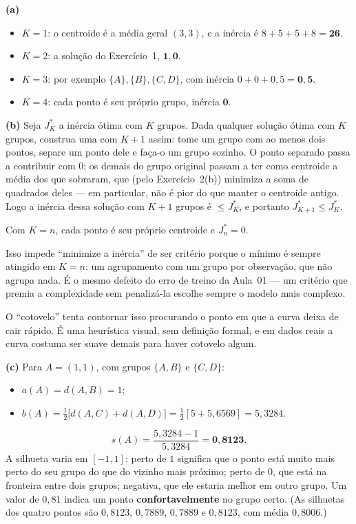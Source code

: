 \documentclass[11pt,a4paper]{article}
\begin{document}
\begin{solucao}
\textbf{(a)}
\begin{itemize}[leftmargin=1.4cm]
  \item $K=1$: o centroide é a média geral $(3,3)$, e a inércia é
        $8+5+5+8 = \mathbf{26}$.
  \item $K=2$: a solução do Exercício~1, $\mathbf{1{,}0}$.
  \item $K=3$: por exemplo $\{A\},\{B\},\{C,D\}$, com inércia
        $0+0+0{,}5 = \mathbf{0{,}5}$.
  \item $K=4$: cada ponto é seu próprio grupo, inércia $\mathbf{0}$.
\end{itemize}

\smallskip
\textbf{(b)} Seja $J_K^\ast$ a inércia ótima com $K$ grupos. Dada qualquer
solução ótima com $K$ grupos, construa uma com $K+1$ assim: tome um grupo com ao
menos dois pontos, separe um ponto dele e faça-o um grupo sozinho. O ponto
separado passa a contribuir com $0$; os demais do grupo original passam a ter
como centroide a média dos que sobraram, que (pelo Exercício~2(b)) minimiza a
soma de quadrados deles --- em particular, não é pior do que manter o centroide
antigo. Logo a inércia dessa solução com $K+1$ grupos é $\le J_K^\ast$, e
portanto $J_{K+1}^\ast \le J_K^\ast$.

Com $K=n$, cada ponto é seu próprio centroide e $J_n^\ast = 0$.

Isso impede ``minimize a inércia'' de ser critério porque o mínimo é sempre
atingido em $K=n$: um agrupamento com um grupo por observação, que não agrupa
nada. É o mesmo defeito do erro de treino da Aula~01 --- um critério que premia a
complexidade sem penalizá-la escolhe sempre o modelo mais complexo.

O ``cotovelo'' tenta contornar isso procurando o ponto em que a curva deixa de
cair rápido. É uma heurística visual, sem definição formal, e em dados reais a
curva costuma ser suave demais para haver cotovelo algum.

\smallskip
\textbf{(c)} Para $A=(1,1)$, com grupos $\{A,B\}$ e $\{C,D\}$:
\begin{itemize}[leftmargin=1.4cm]
  \item $a(A) = d(A,B) = 1$;
  \item $b(A) = \tfrac12\big[d(A,C)+d(A,D)\big] = \tfrac12[5 + 5{,}6569] = 5{,}3284$.
\end{itemize}
\[
  s(A) = \frac{5{,}3284 - 1}{5{,}3284} = \mathbf{0{,}8123}.
\]
A silhueta varia em $[-1,1]$: perto de $1$ significa que o ponto está muito mais
perto do seu grupo do que do vizinho mais próximo; perto de $0$, que está na
fronteira entre dois grupos; negativa, que ele estaria melhor em outro grupo.
Um valor de $0{,}81$ indica um ponto \textbf{confortavelmente} no grupo certo.
(As silhuetas dos quatro pontos são $0{,}8123$, $0{,}7889$, $0{,}7889$ e
$0{,}8123$, com média $0{,}8006$.)


\end{solucao}
\end{document}
